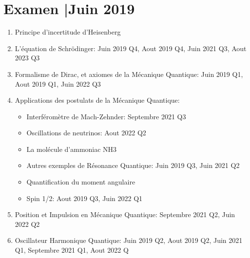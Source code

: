 

\chapter*{Examen \hsp\textcolor{gray75}{|}\hsp Juin 2019}

\begin{enumerate}
    \item Principe d'incertitude d'Heisenberg
    \item L'équation de Schrödinger: Juin 2019 Q4, Aout 2019 Q4, Juin 2021 Q3, Aout 2023 Q3
    \item Formalisme de Dirac, et axiomes de la Mécanique Quantique: Juin 2019 Q1, Aout 2019 Q1, Juin 2022 Q3
    \item Applications des postulats de la Mécanique Quantique: 
    \begin{itemize}
        \item Interféromètre de Mach-Zehnder: Septembre 2021 Q3
        \item Oscillations de neutrinos: Aout 2022 Q2
        \item La molécule d'ammoniac NH3
        \item Autres exemples de Résonance Quantique: Juin 2019 Q3, Juin 2021 Q2
        \item Quantification du moment angulaire
        \item Spin 1/2: Aout 2019 Q3, Juin 2022 Q1
    \end{itemize}
    \item Position et Impulsion en Mécanique Quantique: Septembre 2021 Q2, Juin 2022 Q2
    \item Oscillateur Harmonique Quantique: Juin 2019 Q2, Aout 2019 Q2, Juin 2021 Q1, Septembre 2021 Q1, Aout 2022 Q
\end{enumerate}